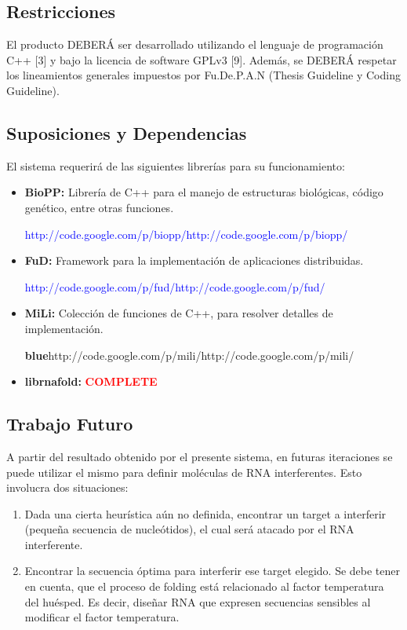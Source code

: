 \documentclass[10pt,a4paper,english,spanish]{article}
\begin{document}
\subsection{Restricciones}
	El producto DEBERÁ ser desarrollado utilizando el lenguaje de programación C++ [3] y bajo la licencia de software 		GPLv3 [9]. Además, se DEBERÁ respetar los lineamientos generales impuestos por Fu.De.P.A.N (Thesis Guideline y 		   	Coding Guideline). 

\subsection{Suposiciones y Dependencias} 
	El sistema requerirá de las siguientes librerías para su funcionamiento:
	\begin{itemize}
		\item \textbf{BioPP:} Librería de C++ para el manejo de estructuras biológicas, código
					genético, entre otras funciones. 
					\par \noindent \textcolor{blue}{http://code.google.com/p/biopp/http://code.google.com/p/biopp/}

		\item \textbf{FuD:} Framework para la implementación de aplicaciones distribuidas. 
					\par \noindent \textcolor{blue}{http://code.google.com/p/fud/http://code.google.com/p/fud/}

		\item \textbf{MiLi:} Colección de funciones de C++, para resolver detalles de implementación.
					\par \noindent \textbf{blue}{http://code.google.com/p/mili/http://code.google.com/p/mili/}

		\item \textbf{librnafold:} \textbf{\textcolor{red}{COMPLETE}}

	\end{itemize}

\subsection{Trabajo Futuro}
A partir del resultado obtenido por el presente sistema, en futuras iteraciones se puede utilizar el mismo para definir moléculas de RNA interferentes. Esto involucra dos situaciones:
\begin{enumerate}
	\item Dada una cierta heurística aún no definida, encontrar un target a interferir (pequeña secuencia de 			 			nucleótidos), el cual será atacado por el RNA interferente.
	\item Encontrar la secuencia óptima para interferir ese target elegido. Se debe tener en cuenta, que el proceso de 			folding está relacionado al factor temperatura del huésped. Es decir, diseñar RNA que expresen secuencias 			sensibles al modificar el factor temperatura.
\end{enumerate}
\end{document}
